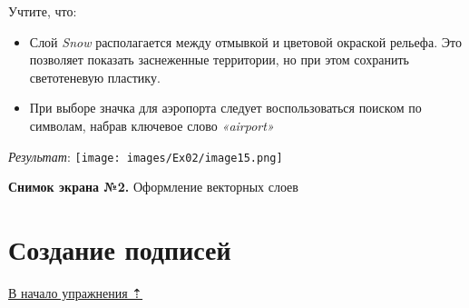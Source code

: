 \documentclass[12pt,]{book}
\begin{document}
Учтите, что:

\begin{itemize}
\item
  Слой \emph{Snow} располагается между отмывкой и цветовой окраской рельефа. Это позволяет показать заснеженные территории, но при этом сохранить светотеневую пластику.
\item
  При выборе значка для аэропорта следует воспользоваться поиском по символам, набрав ключевое слово \emph{«airport»}
\end{itemize}

\emph{Результат}:
\texttt{[image: images/Ex02/image15.png]}

\textbf{Снимок экрана №2.} Оформление векторных слоев

\hypertarget{map-design-general-labels}{%
\section{Создание подписей}\label{map-design-general-labels}}

\protect\hyperlink{map-design-general}{В начало упражнения ⇡}
\end{document}
